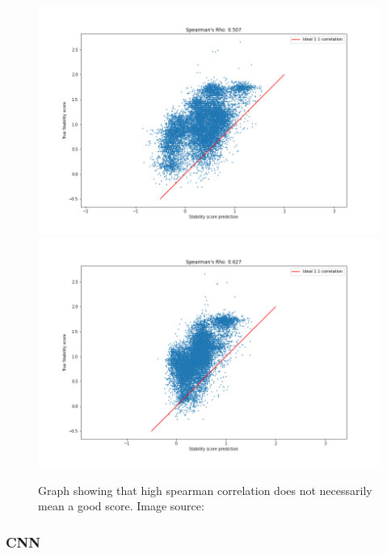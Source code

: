 \begin{figure}[!ht]
  \centering
  \includegraphics[width=0.4\linewidth]{latex/imgs/spearman_1_layer_with_schedule_1024_final.png}
  \includegraphics[width=0.4\linewidth]{latex/imgs/spearman_1_layer_with_schedule_1024_minloss.png}
  \caption{Graph showing that high spearman correlation does not necessarily mean a good score. Image source:\cite{spearman}}
\end{figure}

\subsubsection{CNN}